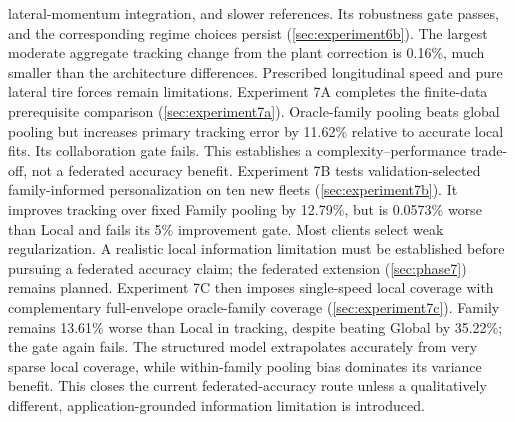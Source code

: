 lateral-momentum integration, and slower references. Its robustness gate
passes, and the corresponding regime choices persist
(\cref{sec:experiment6b}). The largest moderate aggregate tracking change from
the plant correction is 0.16\%, much smaller than the architecture differences.
Prescribed longitudinal speed and pure lateral tire forces remain limitations.
Experiment 7A completes the finite-data prerequisite comparison
(\cref{sec:experiment7a}). Oracle-family pooling beats global pooling but
increases primary tracking error by 11.62\% relative to accurate local fits.
Its collaboration gate fails. This establishes a complexity--performance
trade-off, not a federated accuracy benefit. Experiment 7B tests
validation-selected family-informed personalization on ten new fleets
(\cref{sec:experiment7b}). It improves tracking over fixed Family pooling by
12.79\%, but is 0.0573\% worse than Local and fails its 5\% improvement gate.
Most clients select weak regularization. A realistic local information
limitation must be established before pursuing a federated accuracy claim;
the federated extension (\cref{sec:phase7}) remains planned. Experiment 7C then
imposes single-speed local coverage with complementary full-envelope oracle-family
coverage (\cref{sec:experiment7c}). Family remains 13.61\% worse than Local in
tracking, despite beating Global by 35.22\%; the gate again fails. The structured
model extrapolates accurately from very sparse local coverage, while within-family
pooling bias dominates its variance benefit. This closes the current
federated-accuracy route unless a qualitatively different, application-grounded
information limitation is introduced.
